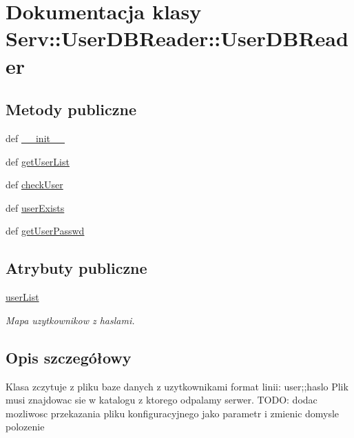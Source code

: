 \hypertarget{class_serv_1_1_user_d_b_reader_1_1_user_d_b_reader}{
\section{Dokumentacja klasy Serv::UserDBReader::UserDBReader}
\label{class_serv_1_1_user_d_b_reader_1_1_user_d_b_reader}
}
\subsection*{Metody publiczne}
\begin{DoxyCompactItemize}
\item 
def \hyperlink{class_serv_1_1_user_d_b_reader_1_1_user_d_b_reader_af3811b4b6123fe47153f9d87631322a9}{\_\-\_\-init\_\-\_\-}
\item 
def \hyperlink{class_serv_1_1_user_d_b_reader_1_1_user_d_b_reader_a84890922ae8efd8ecec178874ec296f6}{getUserList}
\item 
def \hyperlink{class_serv_1_1_user_d_b_reader_1_1_user_d_b_reader_a1fa47b601f3968090cf56b959f50ca94}{checkUser}
\item 
def \hyperlink{class_serv_1_1_user_d_b_reader_1_1_user_d_b_reader_ae3a006e064956d5d09ad1bcaa4c3315f}{userExists}
\item 
def \hyperlink{class_serv_1_1_user_d_b_reader_1_1_user_d_b_reader_ad77c35dbbb9ddf154ab8809463a254c0}{getUserPasswd}
\end{DoxyCompactItemize}
\subsection*{Atrybuty publiczne}
\begin{DoxyCompactItemize}
\item 
\hypertarget{class_serv_1_1_user_d_b_reader_1_1_user_d_b_reader_a69dbf266bd3f0f66f21f30d5bd5fef82}{
\hyperlink{class_serv_1_1_user_d_b_reader_1_1_user_d_b_reader_a69dbf266bd3f0f66f21f30d5bd5fef82}{userList}}
\label{class_serv_1_1_user_d_b_reader_1_1_user_d_b_reader_a69dbf266bd3f0f66f21f30d5bd5fef82}

\begin{DoxyCompactList}\small\item\em Mapa uzytkownikow z haslami. \item\end{DoxyCompactList}\end{DoxyCompactItemize}


\subsection{Opis szczegółowy}
\begin{DoxyVerb}Klasa zczytuje z pliku baze danych z uzytkownikami
format linii:   user;;haslo
Plik musi znajdowac sie w katalogu z ktorego odpalamy serwer.
TODO: dodac mozliwosc przekazania pliku konfiguracyjnego jako parametr i zmienic domysle polozenie

\end{DoxyVerb}
 

